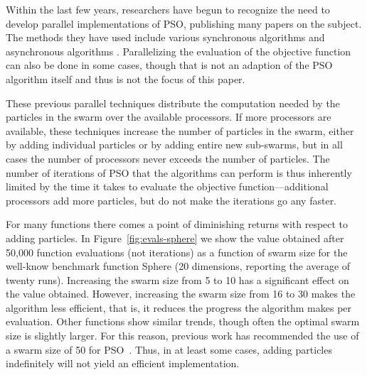 \documentclass[journal,letterpaper]{IEEEtran}
\newcommand{\fig}[1]{Figure~\ref{fig:#1}}
\begin{document}
Within the last few years, researchers have begun to recognize the need to
develop parallel implementations of PSO, publishing many papers on the subject.
The methods they have used include various synchronous algorithms
\cite{mcnabb-2007-parallel-pso-using-mapreduce,
belal-2004-parallel-models-for-pso, chu-2006-intelligent-parallel-pso,
jin-2005-pso-antenna-designs, parsopoulos-2004-parallel-vector-evaluated-pso,
schutte-2004-parallel-global-optimization-with-pso} and asynchronous algorithms
\cite{koh-2006-parallel-asynchronous-pso,
mostaghim-2006-multi-objective-pso-on-grids,
venter-2005-parallel-pso-asynchronous-evaluations}.  Parallelizing the
evaluation of the objective function can also be done in some cases, though
that is not an adaption of the PSO algorithm itself and thus is not the focus
of this paper.

These previous parallel techniques distribute the computation needed by the
particles in the swarm over the available processors.  If more processors are
available, these techniques increase the number of particles in the swarm,
either by adding individual particles or by adding entire new sub-swarms, but
in all cases the number of processors never exceeds the number of particles.
The number of iterations of PSO that the algorithms can perform is thus
inherently limited by the time it takes to evaluate the objective
function---additional processors add more particles, but do not make the
iterations go any faster.

For many functions there comes a point of diminishing returns with respect to
adding particles.  In \fig{evals-sphere} we show the value obtained after
50,000 function evaluations (not iterations) as a function of swarm size for
the well-know benchmark function Sphere (20 dimensions, reporting the average
of twenty runs).  Increasing the swarm size from 5 to 10 has a significant
effect on the value obtained.  However, increasing the swarm size from 16 to 30
makes the algorithm less efficient, that is, it reduces the progress the
algorithm makes per evaluation.  Other functions show similar trends, though
often the optimal swarm size is slightly larger.  For this reason, previous
work has recommended the use of a swarm size of 50 for
PSO~\cite{bratton-2007-defining-a-standard-for-pso}.  Thus, in at least some
cases, adding particles indefinitely will not yield an efficient
implementation. 
\end{document}
